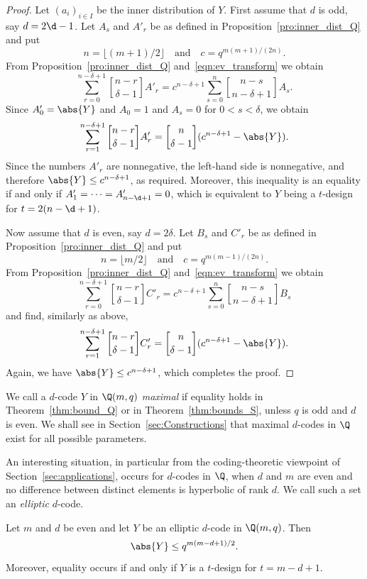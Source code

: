 \begin{proof}
Let $(a_i)_{i\in I}$ be the inner distribution of $Y$. First assume that $d$ is odd, say $d=2\d-1$. Let $A_s$ and $A'_r$ be as defined in Proposition~\ref{pro:inner_dist_Q} and put
\[
n=\lfloor (m+1)/2\rfloor\quad\text{and}\quad c=q^{m(m+1)/(2n)}.
\]
From Proposition~\ref{pro:inner_dist_Q} and~\eqref{eqn:ev_transform} we obtain
\[
\sum_{r=0}^{n-\delta+1}\genfrac{[}{]}{0pt}{}{n-r}{\delta-1}A'_r=c^{n-\delta+1}\sum_{s=0}^n\genfrac{[}{]}{0pt}{}{n-s}{n-\delta+1}A_s.
\]
Since $A'_0=\abs{Y}$ and $A_0=1$ and $A_s=0$ for $0<s<\delta$, we obtain
\[
\sum_{r=1}^{n-\delta+1}\genfrac{[}{]}{0pt}{}{n-r}{\delta-1}A'_r=\genfrac{[}{]}{0pt}{}{n}{\delta-1}(c^{n-\delta+1}-\abs{Y}).
\]
Since the numbers $A'_r$ are nonnegative, the left-hand side is nonnegative, and therefore $\abs{Y}\le c^{n-\delta+1}$, as required. Moreover, this inequality is an equality if and only if $A'_1=\cdots=A'_{n-\d+1}=0$, which is equivalent to $Y$ being a $t$-design for $t=2(n-\d+1)$.
\par
Now assume that $d$ is even, say $d=2\delta$. Let $B_s$ and $C'_r$ be as defined in Proposition~\ref{pro:inner_dist_Q} and put
\[
n=\lfloor m/2\rfloor\quad\text{and}\quad c=q^{m(m-1)/(2n)}.
\]
From Proposition~\ref{pro:inner_dist_Q} and~\eqref{eqn:ev_transform} we obtain
\[
\sum_{r=0}^{n-\delta+1}\genfrac{[}{]}{0pt}{}{n-r}{\delta-1}C'_r=c^{n-\delta+1}\sum_{s=0}^n\genfrac{[}{]}{0pt}{}{n-s}{n-\delta+1}B_s
\]
and find, similarly as above,
\[
\sum_{r=1}^{n-\delta+1}\genfrac{[}{]}{0pt}{}{n-r}{\delta-1}C'_r=
\genfrac{[}{]}{0pt}{}{n}{\delta-1}(c^{n-\delta+1}-\abs{Y}).
\]
Again, we have $\abs{Y}\le c^{n-\delta+1}$, which completes the proof.
\end{proof}
\par
We call a $d$-code $Y$ in $\Q(m,q)$ \emph{maximal} if equality holds in Theorem~\ref{thm:bound_Q} or in Theorem~\ref{thm:bounds_S}, unless $q$ is odd and $d$ is even. We shall see in Section~\ref{sec:Constructions} that maximal $d$-codes in $\Q$ exist for all possible parameters. 
\par
An interesting situation, in particular from the coding-theoretic viewpoint of Section~\ref{sec:applications}, occurs for $d$-codes in $\Q$, when $d$ and $m$ are even and no difference between distinct elements is hyperbolic of rank $d$. We call such a set an \emph{elliptic} $d$-code.
\begin{theorem}
\label{thm:bound_elliptic_Q}
Let $m$ and $d$ be even and let $Y$ be an elliptic $d$-code in $\Q(m,q)$. Then
\[
\abs{Y}\le q^{m(m-d+1)/2}.
\]
Moreover, equality occurs if and only if $Y$ is a $t$-design for $t=m-d+1$.
\end{theorem}
